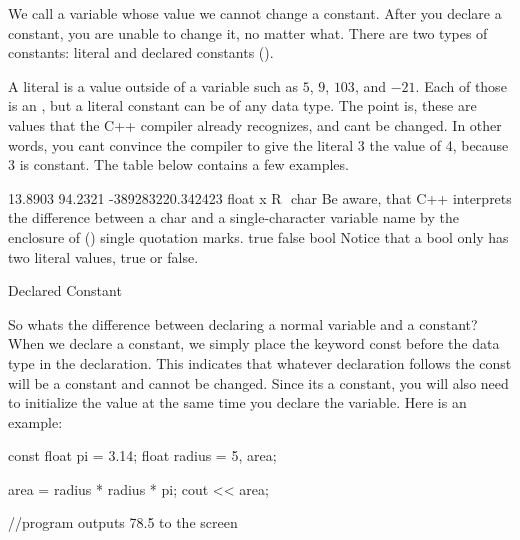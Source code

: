 We call a variable whose value we cannot change a constant. 
After you declare a constant, you are unable to change it, no matter what. 
There are two types of constants: literal and declared constants (). 


A literal is a value outside of a variable such as $5$, $9$, $103$, and $-21$. Each of those is an , but a literal constant can be of any data type. The point is, these are values that the C++ compiler already recognizes, and cant be changed. In other words, you cant convince the compiler to give the literal 3 the value of 4, because 3 is constant. The table below contains a few examples.

13.8903
94.2321
-389283220.342423
float
x
R
%
char
Be aware, that C++ interprets the difference between a char and a single-character variable name by the enclosure of () single quotation marks.
true
false
bool
Notice that a bool only has two literal values, true or false.


Declared Constant

So whats the difference between declaring a normal variable and a constant? When we declare a constant, we simply place the keyword const before the data type in the declaration. This indicates that whatever declaration follows the const will be a constant and cannot be changed. Since its a constant, you will also need to initialize the value at the same time you declare the variable. Here is an example:

const float pi = 3.14;
float radius = 5, area;

area = radius * radius * pi;
cout << area;

//program outputs 78.5 to the screen
